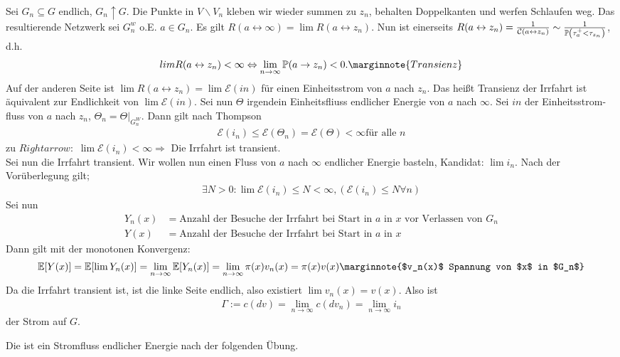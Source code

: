 \begin{beweis}
	Sei $G_n  \subseteq G$ endlich, $G_n \uparrow G$. Die Punkte in $V \backslash V_n$ kleben wir wieder summen zu $z_n$, behalten Doppelkanten und werfen Schlaufen weg. Das resultierende Netzwerk sei $G^w_n$ o.E. $a \in G_n$. Es gilt $R(a \leftrightarrow \infty) = \lim R(a \leftrightarrow z_n)$.
	Nun ist einerseits $R(a \leftrightarrow z_n) = \frac{1}{\leit{a \leftrightarrow z_n}} \sim \frac{1}{\prop{\tau^+_a < \tau_{z_n}}}$, d.h. 
	\begin{equation}
		lim R(a \leftrightarrow z_n) < \infty \Leftrightarrow \lim\limits_{n \to \infty} \prop{a \to z_n} < 0. \marginnote{Transienz}
	\end{equation}
	Auf der anderen Seite ist $\lim R(a \leftrightarrow z_n) = \lim \mathcal{E}(in)$ für einen Einheitsstrom von $a$ nach $z_n$. Das heißt Transienz der Irrfahrt ist äquivalent zur Endlichkeit von $\lim \mathcal{E}(in)$. Sei nun $\Theta$ irgendein Einheitsfliuss endlicher Energie von $a$ nach $\infty$. Sei $in$ der Einheitsstrom-fluss von $a$ nach $z_n$, $\Theta_n = \Theta|_{G^W_n}$. Dann gilt nach Thompson 
	\begin{align}
		\mathcal{E}(i_n) \leq \mathcal{E}(\Theta_n) = \mathcal{E}(\Theta) < \infty \text{für alle } n
	\end{align}
	zu $Rightarrow:$ $\lim \mathcal{E}(i_n) < \infty \Rightarrow$ Die Irrfahrt ist transient. \\
	
	Sei nun die Irrfahrt transient. Wir wollen nun einen Fluss von $a$ nach $\infty$ endlicher Energie basteln, Kandidat: $\lim i_n.$ Nach der Vorüberlegung gilt;
	\begin{align}
		\exists N > 0: \lim \mathcal{E}(i_n) \leq N < \infty, (\mathcal{E}(i_n)\leq N \forall n)
	\end{align}
	Sei nun 
	\begin{align}
		Y_n(x) &= \text{Anzahl der Besuche der Irrfahrt bei Start in $a$ in $x$ vor Verlassen von } G_n \\
		Y(x) &= \text{Anzahl der Besuche der Irrfahrt bei Start in $a$ in $x$} 
	\end{align}
	Dann gilt mit der monotonen Konvergenz:
	\begin{align}
		\EWE{Y(x)} = \EWE{\lim Y_n(x)} = \lim\limits_{n \to \infty} \EWE{Y_n(x)} = \lim\limits_{n \to \infty} \pi(x) v_n(x) = \pi(x)v(x) \marginnote{$v_n(x)$ Spannung von $x$ in $G_n$}
	\end{align}
	Da die Irrfahrt transient ist, ist die linke Seite endlich, also existiert $\lim v_n(x) = v(x)$. Also ist
	\begin{align}
		\Gamma := c (dv) = \lim\limits_{n\to\infty} c (dv_n) = \lim\limits_{n\to\infty} i_n
	\end{align}
	der Strom auf $G$.

	Die ist ein Stromfluss endlicher Energie nach der folgenden Übung.
\end{beweis}

